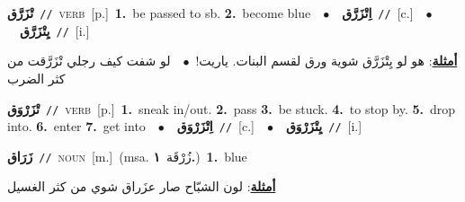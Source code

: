 \documentclass[10pt,a4paper,twoside]{article} %
\begin{document}
\begin{multicols}{2}
{\setlength\topsep{0pt}\textbf{\foreignlanguage{arabic}{تْزَرَّق}}\ {\color{gray}\texttt{//}\color{black}}\ \textsc{verb}\ [p.]\ \textbf{1.}~be passed to sb.  \textbf{2.}~become blue\ \ $\bullet$\ \ \setlength\topsep{0pt}\textbf{\foreignlanguage{arabic}{اِتْزَرَّق}}\ {\color{gray}\texttt{//}\color{black}}\ [c.]\ \ $\bullet$\ \ \setlength\topsep{0pt}\textbf{\foreignlanguage{arabic}{يِتْزَرَّق}}\ {\color{gray}\texttt{//}\color{black}}\ [i.]\  \begin{flushright}\color{gray}\foreignlanguage{arabic}{\textbf{\underline{\foreignlanguage{arabic}{أمثلة}}}: هو لو يِتْزَرَّق شوية ورق لقسم البنات. ياريت!\ $\bullet$\ \  لو شفت كيف رجلي تْزَرَّقت من كثر الضرب}\end{flushright}\color{black}} \vspace{2mm}

{\setlength\topsep{0pt}\textbf{\foreignlanguage{arabic}{تْزَرْوَق}}\ {\color{gray}\texttt{//}\color{black}}\ \textsc{verb}\ [p.]\ \textbf{1.}~sneak in/out.  \textbf{2.}~pass  \textbf{3.}~be stuck.  \textbf{4.}~to stop by.  \textbf{5.}~drop into.  \textbf{6.}~enter  \textbf{7.}~get into\ \ $\bullet$\ \ \setlength\topsep{0pt}\textbf{\foreignlanguage{arabic}{اِتْزَرْوَق}}\ {\color{gray}\texttt{//}\color{black}}\ [c.]\ \ $\bullet$\ \ \setlength\topsep{0pt}\textbf{\foreignlanguage{arabic}{يِتْزَرْوَق}}\ {\color{gray}\texttt{//}\color{black}}\ [i.]\ } \vspace{2mm}

{\setlength\topsep{0pt}\textbf{\foreignlanguage{arabic}{زَرَاق}}\ {\color{gray}\texttt{//}\color{black}}\ \textsc{noun}\ [m.]\ \color{gray}(msa. \foreignlanguage{arabic}{زُرْقَة}~\foreignlanguage{arabic}{\textbf{١.}})\color{black}\ \textbf{1.}~blue\  \begin{flushright}\color{gray}\foreignlanguage{arabic}{\textbf{\underline{\foreignlanguage{arabic}{أمثلة}}}: لون الشبّاح صار عزَراق شوي من كثر الغسيل}\end{flushright}\color{black}} \vspace{2mm}


\end{multicols}
\end{document}
